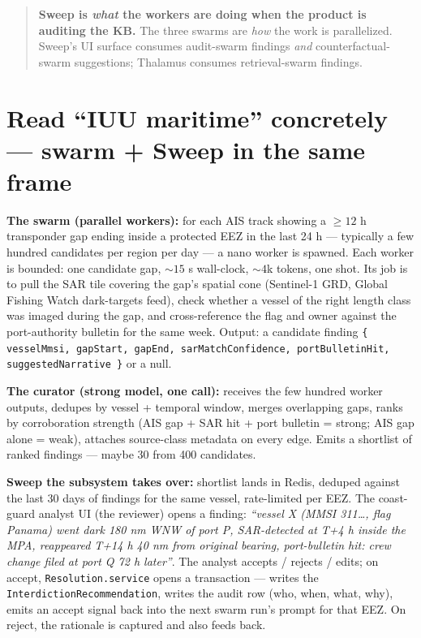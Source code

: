 \begin{quote}
\textbf{Sweep is \emph{what} the workers are doing when the product is auditing the KB.} The three swarms are \emph{how} the work is parallelized. Sweep's UI surface consumes audit-swarm findings \emph{and} counterfactual-swarm suggestions; Thalamus consumes retrieval-swarm findings.
\end{quote}

\section{Read ``IUU maritime'' concretely --- swarm + Sweep in the same frame}

\textbf{The swarm (parallel workers):} for each AIS track showing a $\geq 12$ h transponder gap ending inside a protected EEZ in the last 24 h --- typically a few hundred candidates per region per day --- a nano worker is spawned. Each worker is bounded: one candidate gap, $\sim 15$ s wall-clock, $\sim 4$k tokens, one shot. Its job is to pull the SAR tile covering the gap's spatial cone (Sentinel-1 GRD, Global Fishing Watch dark-targets feed), check whether a vessel of the right length class was imaged during the gap, and cross-reference the flag and owner against the port-authority bulletin for the same week. Output: a candidate finding \texttt{\{ vesselMmsi, gapStart, gapEnd, sarMatchConfidence, portBulletinHit, suggestedNarrative \}} or a null.

\textbf{The curator (strong model, one call):} receives the few hundred worker outputs, dedupes by vessel + temporal window, merges overlapping gaps, ranks by corroboration strength (AIS gap + SAR hit + port bulletin = strong; AIS gap alone = weak), attaches source-class metadata on every edge. Emits a shortlist of ranked findings --- maybe 30 from 400 candidates.

\textbf{Sweep the subsystem takes over:} shortlist lands in Redis, deduped against the last 30 days of findings for the same vessel, rate-limited per EEZ. The coast-guard analyst UI (the reviewer) opens a finding: \emph{``vessel X (MMSI 311\dots, flag Panama) went dark 180 nm WNW of port P, SAR-detected at T+4 h inside the MPA, reappeared T+14 h 40 nm from original bearing, port-bulletin hit: crew change filed at port Q 72 h later''}. The analyst accepts / rejects / edits; on accept, \texttt{Resolution.service} opens a transaction --- writes the \texttt{InterdictionRecommendation}, writes the audit row (who, when, what, why), emits an accept signal back into the next swarm run's prompt for that EEZ. On reject, the rationale is captured and also feeds back.

